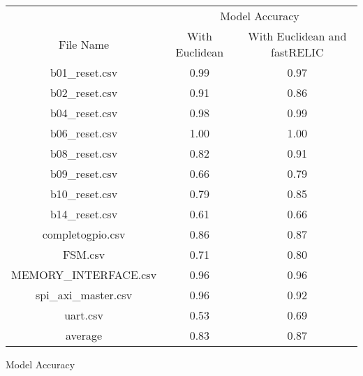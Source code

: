 \begin{tabular}{|c|c|c|}
    \hline
     & \multicolumn{2}{c|}{Model Accuracy}\\
    \cline {2-3}
    File Name & With Euclidean & With Euclidean and fastRELIC \\
    \hline
    \hline
    b01\_reset.csv & 0.99 & 0.97\\
    \hline
    b02\_reset.csv & 0.91 & 0.86\\
    \hline
    b04\_reset.csv & 0.98 & 0.99\\
    \hline
    b06\_reset.csv & 1.00 & 1.00\\
    \hline
    b08\_reset.csv & 0.82 & 0.91\\
    \hline
    b09\_reset.csv & 0.66 & 0.79\\
    \hline
    b10\_reset.csv & 0.79 & 0.85\\
    \hline
    b14\_reset.csv & 0.61 & 0.66\\
    \hline
    completogpio.csv & 0.86 & 0.87\\
    \hline
    FSM.csv & 0.71 & 0.80\\
    \hline
    MEMORY\_INTERFACE.csv & 0.96 & 0.96\\
    \hline
    spi\_axi\_master.csv & 0.96 &0.92\\
    \hline
    uart.csv & 0.53 & 0.69\\
    \hline
    \hline
    average & 0.83 & 0.87\\
    \hline
\end{tabular}
\caption{Model Accuracy}
\label{tab:Model Accuracy Feature Redundant}
